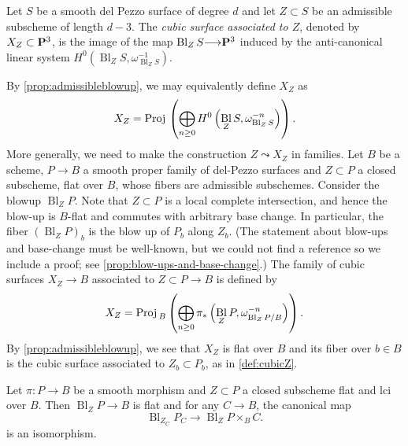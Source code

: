 \documentclass[12pt,reqno]{amsart}
\DeclareMathOperator{\Bl}{Bl}
\renewcommand{\to}{{\longrightarrow}}
\numberwithin{equation}{section}
\newcommand{\Proj}{{\text{\rm Proj}\,}}
\begin{document}
\begin{definition}
  \label{def:cubicZ}
  Let $S$ be a smooth del Pezzo surface of degree $d$ and let $Z \subset S$ be an admissible subscheme of length $d-3$.
  The \emph{cubic surface associated to $Z$}, denoted by
  $X_Z \subset \P^3$, is the image of the map
  $\Bl_{Z}S \to \P^3$ induced by the anti-canonical linear system $H^0\left(\Bl_ZS, \omega_{\Bl_Z S}^{-1}\right)$.
\end{definition}
By \autoref{prop:admissibleblowup}, we may equivalently define $X_Z$ as
\[ X_Z = \Proj \left( \bigoplus_{n \geq 0} H^0\left( \Bl_ZS, \omega_{\Bl_Z S}^{-n} \right) \right).\]
More generally, we need to make the construction $Z \leadsto X_Z$ in families.
Let $B$ be a scheme, $P \to B$ a smooth proper family of del-Pezzo surfaces and $Z \subset  P$ a closed subscheme, flat over $B$, whose fibers are admissible subschemes.
Consider the blowup $\Bl_{ Z}  P$.
Note that $Z \subset  P$ is a local complete intersection, and hence the blow-up is $B$-flat and commutes with arbitrary base change.
In particular, the fiber $(\Bl_ZP)_b$ is the blow up of $P_b$ along $Z_b$.
(The statement about blow-ups and base-change must be well-known, but we could not find a reference so we include a proof; see \autoref{prop:blow-ups-and-base-change}.)
The family of cubic surfaces $X_Z \to B$ associated to $Z \subset P \to B$ is defined by
\[
  X_Z = \Proj_B \left(\bigoplus_{n \geq 0}\pi_*\left(\Bl_ZP, \omega_{\Bl_ZP/B}^{-n}\right)\right).
\]
By \autoref{prop:admissibleblowup}, we see that $X_Z$ is flat over $B$
and its fiber over $b \in B$ is the cubic surface associated to
$Z_b \subset P_b$, as in \autoref{def:cubicZ}.
\begin{proposition}\label{prop:blow-ups-and-base-change}
  Let $\pi \colon P \to B$ be a smooth morphism and $Z \subset P$ a closed subscheme flat and lci over $B$.
  Then $\Bl_ZP \to B$ is flat and for any $C \to B$, the canonical map
  \[  \Bl_{Z_C} P_C \to \Bl_ZP \times_B C.\]
  is an isomorphism.
\end{proposition}
\end{document}
